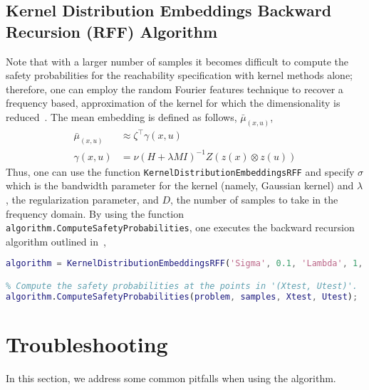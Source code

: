 \documentclass[11pt]{article}
\begin{document}
\subsection{Kernel Distribution Embeddings Backward Recursion (RFF) Algorithm}

Note that with a larger number of samples it becomes difficult to compute the safety probabilities for the reachability specification with kernel methods alone; therefore, one can employ the random Fourier features technique to recover a frequency based, approximation of the kernel for which the dimensionality is reduced~\cite{thorpe2019stochastic}. The mean embedding is defined as follows,
$\bar{\mu}_{(x, u)}$,
\begin{align}
    \bar{\mu}_{(x, u)} &\approx
    \zeta^{\top}
    \gamma(x, u) \\
    \gamma(x, u) &=
    \nu
    (H + \lambda M I)^{-1} Z (z(x) \otimes z(u))
    \label{eqn: gamma coefficients}
\end{align}
Thus, one can use the function \texttt{KernelDistributionEmbeddingsRFF} and specify $\sigma$ which is the bandwidth parameter for the kernel (namely, Gaussian kernel) and $\lambda$, the regularization parameter, and $D$, the number of samples to take in the frequency domain. By using the function \texttt{algorithm.ComputeSafetyProbabilities}, one executes the backward recursion algorithm outlined in~\cite[Alg. 2]{thorpe2019stochastic},
\begin{lstlisting}[language=Matlab]
% Define the algorithm Kernel Distribution Embeddings (RFF)
algorithm = KernelDistributionEmbeddingsRFF('Sigma', 0.1, 'Lambda', 1, 'D', 1000);

% Compute the safety probabilities at the points in '(Xtest, Utest)'.
algorithm.ComputeSafetyProbabilities(problem, samples, Xtest, Utest);
\end{lstlisting}


\section{Troubleshooting}

In this section, we address some common pitfalls when using the algorithm.
\end{document}
